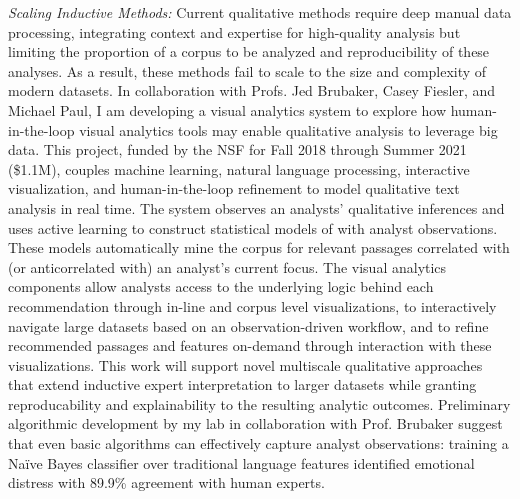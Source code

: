 \documentclass[11pt]{article}
\begin{document}
\emph{Scaling Inductive Methods:} Current qualitative methods require deep manual data processing, integrating context and expertise for high-quality analysis but limiting the proportion of a corpus to be analyzed and reproducibility of these analyses. As a result, these methods fail to scale to the size and complexity of modern datasets. 
In collaboration with Profs. Jed Brubaker, Casey Fiesler, and Michael Paul, I am developing a visual analytics system to explore how human-in-the-loop visual analytics tools may enable qualitative analysis to leverage big data.  This project, funded by the NSF for Fall 2018 through Summer 2021 (\$1.1M), couples machine learning, natural language processing, interactive visualization, and human-in-the-loop refinement to model qualitative text analysis in real time. The system observes an analysts' qualitative inferences and uses active learning to construct statistical models of with analyst observations. These models automatically mine the corpus for relevant passages correlated with (or anticorrelated with) an analyst's current focus. The visual analytics components allow analysts access to the underlying logic behind each recommendation through in-line and corpus level visualizations, to interactively navigate large datasets based on an observation-driven workflow, and to refine recommended passages and features on-demand through interaction with these visualizations.
This work will support novel multiscale qualitative approaches that extend inductive expert interpretation to larger datasets while granting reproducability and explainability to the resulting analytic outcomes.
Preliminary algorithmic development by my lab in collaboration with Prof. Brubaker suggest that even basic algorithms can effectively capture analyst observations: training a Na\"ive Bayes classifier over traditional language features identified emotional distress with 89.9\% agreement with human experts.
\end{document}
